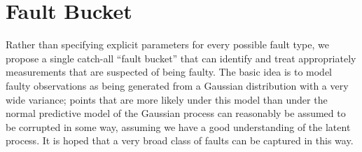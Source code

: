 \documentclass{article}
\newcommand{\psff}[1]{\texttt{[image: \#1.eps]}}
\begin{document}


\section{Fault Bucket}
Rather than specifying explicit parameters for every possible fault
type, we propose a single catch-all ``fault
bucket'' that can identify and treat appropriately measurements that
are suspected of being faulty.  The basic idea is to model faulty
observations as being generated from a Gaussian distribution with a
very wide variance; points that are more likely under this model than
under the normal predictive model of the Gaussian process can
reasonably be assumed to be corrupted in some way, assuming we have a
good understanding of the latent process. It is hoped that a very broad class of faults can be captured in this way.
\end{document}
